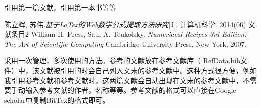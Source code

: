 \documentclass{article} %
\begin{document}

	引用第一篇文献\cite{article1}，引用第一本书\cite{book1}等等
	\begin{thebibliography}{99}
			陈立辉, 苏伟.\emph{基于LaTex的Web数学公式提取方法研究}[J]. 计算机科学. 2014(06)
			文献条目2
			William H. Press, Saul A. Teukolsky. \emph{Numeriacal Recipes 3rd Edition: The Art of Scientific Computing} Cambridge University Press, New York, 2007.
	\end{thebibliography}

	采用一次管理，多次使用的方法。参考的文献放在参考文献库（ RefData.bib文件）中，该文献被引用的时会自己列入文末的参考文献中。这种方式很方便，例如我引用参考文献\cite{sezen2021alternative}和参考文献\cite{pewowaruk2021solution}时，这两篇文献会自动出现在文末的参考文献中，不需要手动输入参考文献的作者，名称等等。参考文献的格式可以直接在Google scholar中复制BitTex的格式即可。
	
	\nocite{*}
\end{document}
